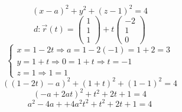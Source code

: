 \documentclass{article}
\begin{document}
\[ (x-a)^2 + y^2 + (z-1)^2 = 4 \]
\[ d: \vec{r}(t) = \begin{pmatrix} 1 \\ 1 \\ 1 \end{pmatrix} + t \begin{pmatrix} -2 \\ 1 \\ 0 \end{pmatrix} \]
\[ \begin{cases} x = 1 - 2t  \Rightarrow a = 1 - 2(-1) = 1 + 2 = 3 \\ y = 1 + t \Rightarrow 0 = 1 + t \Rightarrow t = -1 \\ z = 1 \Rightarrow 1 = 1 \end{cases} \]
\[ ((1-2t)-a)^2 + (1+t)^2 + (1-1)^2 = 4 \]
\[ (-a+2at)^2 + t^2 + 2t + 1 = 4 \]
\[ a^2 - 4a + + 4a^2t^2 + t^2 + 2t + 1 = 4 \]
\end{document}
